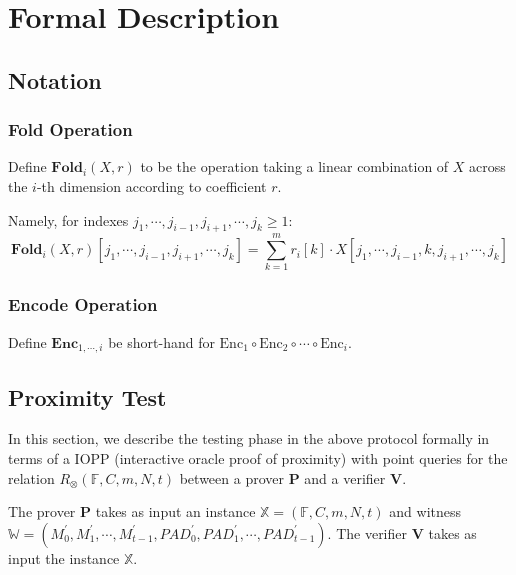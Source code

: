 
\section{Formal Description}

\subsection{Notation}

\subsubsection{Fold Operation}

Define $\textbf{Fold}_i(X, r)$ to be the operation taking a linear combination of $X$ across the $i$-th dimension according to coefficient $r$. 

Namely, for indexes $j_1, \cdots, j_{i-1}, j_{i+1}, \cdots , j_{k} \ge 1$:
$$
\textbf{Fold}_i(X, r)[j_1, \cdots, j_{i-1}, j_{i+1}, \cdots , j_{k}] = \sum_{k=1}^{m} r_{i}[k] \cdot X[j_1, \cdots, j_{i-1}, k, j_{i+1}, \cdots , j_{k}]
$$

\subsubsection{Encode Operation}

Define $\textbf{Enc}_{1,\cdots,i}$ be short-hand for $\text{Enc}_1 \circ \text{Enc}_2 \circ \cdots \circ \text{Enc}_{i}$.

\subsection{Proximity Test}

In this section, we describe the testing phase in the above protocol formally in terms of a IOPP (interactive oracle proof of proximity) with point queries for the relation $R_\otimes(\mathbb{F}, C, m, N, t)$ between a prover $\textbf{P}$ and a verifier $\textbf{V}$.

The prover $\textbf{P}$ takes as input an instance $\mathbb{X} = (\mathbb{F}, C, m, N, t)$ and witness $\mathbb{W} = (M_0^{\prime}, M_1^{\prime}, \cdots, M_{t-1}^{\prime}, PAD_0^{\prime}, PAD_1^{\prime}, \cdots, PAD_{t-1}^{\prime})$. The verifier $\textbf{V}$ takes as input the instance $\mathbb{X}$.

